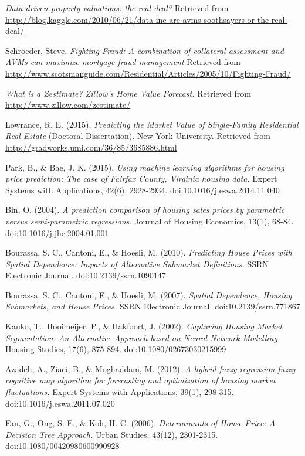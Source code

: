 \documentclass[letter,10pt]{article}
\begin{document}
\begin{multicols}{2}
\begin{thebibliography}{9}
			\textit{Data-driven property valuations: the real deal?}
			Retrieved from \\ \small{\url{http://blog.kaggle.com/2010/06/21/data-inc-are-avms-soothsayers-or-the-real-deal/}}
			
			Schroeder, Steve.
			\textit{Fighting Fraud: A combination of collateral assessment and AVMs can maximize mortgage-fraud management}
			Retrieved from \\ \small{\url{http://www.scotsmanguide.com/Residential/Articles/2005/10/Fighting-Fraud/}}
			
			\textit{What is a Zestimate? Zillow's Home Value Forecast.}
			Retrieved from \\
			\small{\url{http://www.zillow.com/zestimate/}}
			
			Lowrance, R. E. (2015).
			\textit{Predicting the Market Value of Single-Family Residential Real Estate}
			(Doctoral Dissertation). New York University. Retrieved from \small{\url{http://gradworks.umi.com/36/85/3685886.html}}
			
			Park, B., \& Bae, J. K. (2015).
			\textit{Using machine learning algorithms for housing price prediction: The case of Fairfax County, Virginia housing data.}
			Expert Systems with Applications, 42(6), 2928-2934. doi:10.1016/j.eswa.2014.11.040
			
			Bin, O. (2004).
			\textit{A prediction comparison of housing sales prices by parametric versus semi-parametric regressions.}
			Journal of Housing Economics, 13(1), 68-84. doi:10.1016/j.jhe.2004.01.001
			
			Bourassa, S. C., Cantoni, E., \& Hoesli, M. (2010). 
			\textit{Predicting House Prices with Spatial Dependence: Impacts of Alternative Submarket Definitions.}
			SSRN Electronic Journal. doi:10.2139/ssrn.1090147
			
			Bourassa, S. C., Cantoni, E., \& Hoesli, M. (2007).
			\textit{Spatial Dependence, Housing Submarkets, and House Prices.}
			SSRN Electronic Journal. doi:10.2139/ssrn.771867
			
			Kauko, T., Hooimeijer, P., \& Hakfoort, J. (2002).
			\textit{Capturing Housing Market Segmentation: An Alternative Approach based on Neural Network Modelling.}
			Housing Studies, 17(6), 875-894. doi:10.1080/02673030215999
			
			Azadeh, A., Ziaei, B., \& Moghaddam, M. (2012).
			\textit{A hybrid fuzzy regression-fuzzy cognitive map algorithm for forecasting and optimization of housing market fluctuations.}
			Expert Systems with Applications, 39(1), 298-315. doi:10.1016/j.eswa.2011.07.020
			
			Fan, G., Ong, S. E., \& Koh, H. C. (2006).
			\textit{Determinants of House Price: A Decision Tree Approach.}
			Urban Studies, 43(12), 2301-2315. doi:10.1080/00420980600990928
		\end{thebibliography}
	\end{multicols}
\end{document}
